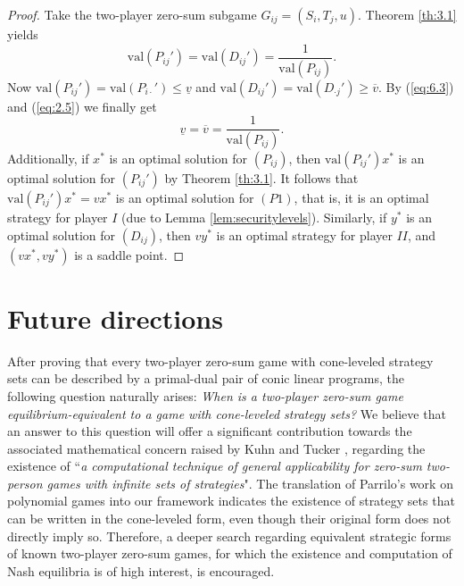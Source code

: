\documentclass[11pt, twoside]{article}
\numberwithin{equation}{section}
\theoremstyle{definition}
\begin{document}
\begin{proof}
    Take the two-player zero-sum subgame $G_{ij}=(S_i,T_j,u)$. Theorem \ref{th:3.1} yields 
    \begin{equation}\label{eq:6.3}
    \text{val}(P_{ij}')=\text{val}(D_{ij}')=\displaystyle\frac{1}{\text{val}(P_{ij})}.
    \end{equation}
    Now $\text{val}(P_{ij}')=\text{val}(P_{i\cdot}')\leq\underline{v}$ and $\text{val}(D_{ij}')=\text{val}(D_{\cdot j}')\geq\overline{v}$. By (\ref{eq:6.3}) and (\ref{eq:2.5}) we finally get 
    \begin{equation*}
        \underline{v}=\overline{v}=\displaystyle\frac{1}{\text{val}(P_{ij})}.
        \end{equation*}
    Additionally, if $x^*$ is an optimal solution for \hyperlink{pij}{$(P_{ij})$}, then $\text{val}(P_{ij}')x^*$ is an optimal solution for $(P_{ij}')$ by Theorem \ref{th:3.1}. It follows that $\text{val}(P_{ij}')x^*=vx^*$ is an optimal solution for \hyperlink{p1}{$(P1)$}, that is, it is an optimal strategy for player $I$ (due to Lemma \ref{lem:securitylevels}). Similarly, if $y^*$ is an optimal solution for \hyperlink{dij}{$(D_{ij})$}, then $vy^*$ is an optimal strategy for player $II$, and $(vx^*,vy^*)$ is a saddle point.
\end{proof}


\vspace{-0.1cm}\section{Future directions}\label{sec:7}\vspace{-0.2cm}

After proving that every two-player zero-sum game with cone-leveled strategy sets can be described by a primal-dual pair of conic linear programs, the following question naturally arises: \textit{When is a two-player zero-sum game equilibrium-equivalent to a game with cone-leveled strategy sets?} We believe that an answer to this question will offer a significant contribution towards the associated mathematical concern raised by Kuhn and Tucker \cite{kuhn1953contributions}, regarding the existence of ``\textit{a computational technique of general
applicability for zero-sum two-person games with infinite sets of strategies}". The translation of Parrilo's work on polynomial games \cite{parrilo2006polynomial} into our framework indicates the existence of strategy sets that can be written in the cone-leveled form, even though their original form does not directly imply so. Therefore, a deeper search regarding equivalent strategic forms of known two-player zero-sum games, for which the existence and computation of Nash equilibria is of high interest, is encouraged.\par
\end{document}
